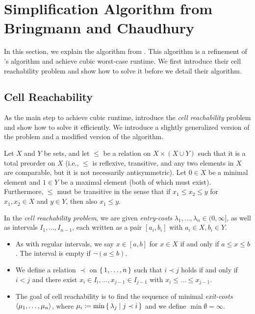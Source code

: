 \section{Simplification Algorithm from Bringmann and Chaudhury}
\label{sec:cubic_algo}
In this section, we explain the algorithm from \citeauthor{polyline_simplification_has_cubic_complexity_bringmannetal}. This algorithm is a refinement of \citeauthor{on_optimal_polyline_simplification_using_the_hausdorff_and_frechet_distance}'s algorithm and achieve cubic worst-case runtime. We first introduce their cell reachability problem and show how to solve it before we detail their algorithm.

\subsection{Cell Reachability}
\label{ssec:cell_reachability}
As the main step to achieve cubic runtime, \citeauthor{polyline_simplification_has_cubic_complexity_bringmannetal} introduce the \emph{cell reachability} problem and show how to solve it efficiently. We introduce a slightly generalized version of the problem and a modified version of the algorithm. 

\begin{definition}
	Let \(X\) and \(Y\) be sets, and let \(\leq\) be a relation on \(X \times (X \cup Y)\) such that it is a total preorder on \(X\) (i.e., \(\leq\) is reflexive, transitive, and any two elements in \(X\) are comparable, but it is not necessarily antisymmetric). Let \(0 \in X\) be a minimal element and \(1 \in Y\) be a maximal element (both of which must exist). Furthermore, \(\leq\) must be transitive in the sense that if \(x_1 \leq x_2 \leq y\) for \(x_1, x_2 \in X\) and \(y \in Y\), then also \(x_1 \leq y\).

	In the \emph{cell reachability problem}, we are given \emph{entry-costs} \(\lambda_1, \dots, \lambda_n \in (0, \infty]\), as well as intervals \(I_1, \dots, I_{n-1}\), each written as a pair \([a_i, b_i]\) with \(a_i \in X, b_i \in Y\).

	\begin{itemize}
		\item As with regular intervals, we say \(x \in [a, b]\) for \(x \in X\) if and only if \(a \leq x \leq b\). The interval is empty if \(\lnot (a \leq b)\).

		\item We define a relation \(\prec\) on \(\set{1, \dots, n}\) such that \(i \prec j\) holds if and only if \(i < j\) and there exist \(x_i \in I_i, \dots, x_{j-1} \in I_{j-1}\) with \(x_i \leq \dots \leq x_{j - 1}\).

		\item The goal of cell reachability is to find the sequence of minimal \emph{exit-costs} \(\left\langle\mu_1, \dots, \mu_n\right\rangle\), where \(\mu_i \coloneq \min \set{ \lambda_j \mid j \prec i}\) and we define \(\min \emptyset = \infty\).
	\end{itemize}
\end{definition}

